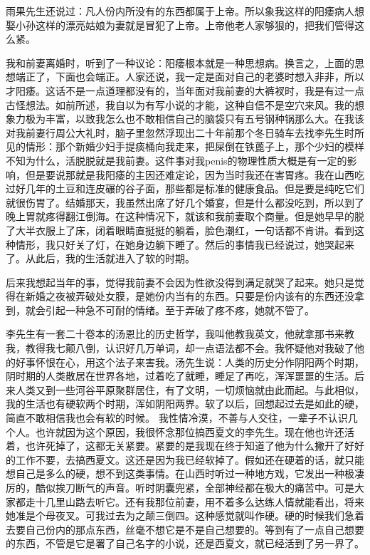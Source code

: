 雨果先生还说过：凡人份内所没有的东西都属于上帝。所以象我这样的阳痿病人想娶小孙这样的漂亮姑娘为妻就是冒犯了上帝。上帝他老人家够狠的，把我们管得这么紧。 

我和前妻离婚时，听到了一种议论：阳痿根本就是一种思想病。换言之，上面的思想端正了，下面也会端正。人家还说，我一定是面对自己的老婆时想入非非，所以才阳痿。这话不是一点道理都没有的，当年面对我前妻的大裤衩时，我是有过一点古怪想法。如前所述，我自以为有写小说的才能，这种自信不是空穴来风。我的想象力极为丰富，以致我怎么也不敢相信自己的脑袋只有五号钢种锅那么大。在我该对我前妻行周公大礼时，脑子里忽然浮现出二十年前那个冬日骑车去找李先生时所见的情形：那个新婚少妇手提痰桶向我走来，把屎倒在铁蓖子上，那个少妇的模样不知为什么，活脱脱就是我前妻。这件事对我penis的物理性质大概是有一定的影响，但是要说那就是我阳痿的主因还难定论，因为当时我还在害胃疼。我在山西吃过好几年的土豆和连皮碾的谷子面，那些都是标准的健康食品。但是要是纯吃它们就很伤胃了。结婚那天，我虽然出席了好几个婚宴，但是什么都没吃到，所以到了晚上胃就疼得翻江倒海。在这种情况下，就该和我前妻取个商量。但是她早早的脱了大半衣服上了床，闭着眼睛直挺挺的躺着，脸色潮红，一句话都不肯讲。看到这种情形，我只好关了灯，在她身边躺下睡了。然后的事情我已经说过，她哭起来了。从此后，我的生活就进入了软的时期。 

后来我想起当年的事，觉得我前妻不会因为性欲没得到满足就哭了起来。她只是觉得在新婚之夜被弄破处女膜，是她份内当有的东西。只要是份内该有的东西还没拿到，就会引起一种急不可耐的情绪。至于弄破了疼不疼，她就不管了。 

李先生有一套二十卷本的汤恩比的历史哲学，我叫他教我英文，他就拿那书来教我，教得我七颠八倒，认识好几万单词，却一点语法都不会。我怀疑他对我破了他的好事怀恨在心，用这个法子来害我。汤先生说：人类的历史分作阴阳两个时期，阴时期的人类散居在世界各地，过着吃了就睡，睡足了再吃，浑浑噩噩的生活。后来人类又到一些河谷平原聚群居住，有了文明，一切烦恼就由此而起。与此相似，我的生活也有硬软两个时期，浑如阴阳两界。软了以后，回想起过去是如此的硬，简直不敢相信我也会有软的时候。 我性情冷漠，不善与人交往，一辈子不认识几个人。也许就因为这个原因，我很怀念那位搞西夏文的李先生。现在他也许还活着，也许死掉了，这都无关紧要。紧要的是我现在终于知道了他为什么撇开了好好的工作不要，去搞西夏文。这还是因为我已经软掉了。假如还在硬着的话，就只能想自己是多么的硬，想不到这类事情。在山西时听过一种地方戏，它发出一种极凄厉的，酷似挨刀断气的声音。听时阴囊兜紧，全部神经都在极大的痛苦中。可是大家都走十几里山路去听它。还有我那位前妻，用不着多么达练人情就能看出，将来她准是个母夜叉。可我过去为之颠三倒四。这种感觉就叫作硬。硬的时候我们急着去要自己份内的那点东西，丝毫不想它是不是自己想要的。等到有了一点自己想要的东西，不管是它是署了自己名字的小说，还是西夏文，就已经活到了另一界了。

